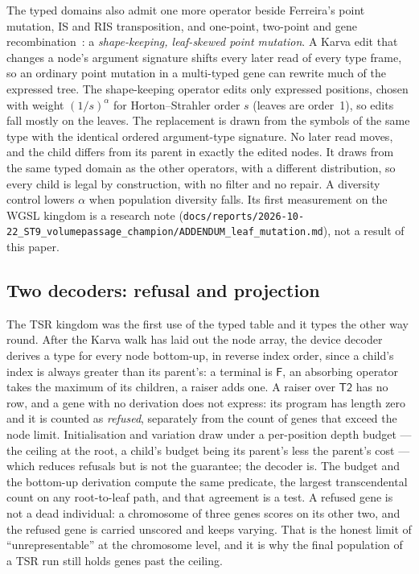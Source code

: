 \documentclass[sigconf,nonacm]{acmart}
\newcommand{\ty}[1]{\textsf{#1}}
\begin{document}
The typed domains also admit one more operator beside Ferreira's point
mutation, IS and RIS transposition, and one-point, two-point and gene
recombination~\cite{ferreira2001gep}: a \emph{shape-keeping, leaf-skewed point
mutation}. A Karva edit that changes a node's argument signature shifts every
later read of every type frame, so an ordinary point mutation in a multi-typed
gene can rewrite much of the expressed tree. The shape-keeping operator edits
only expressed positions, chosen with weight $(1/s)^{\alpha}$ for
Horton--Strahler order $s$ (leaves are order~1), so edits fall mostly on the
leaves. The replacement is drawn from the symbols of the same type with the
identical ordered argument-type signature. No later read moves, and the child
differs from its parent in exactly the edited nodes. It draws from the same
typed domain as the other operators, with a different distribution, so every
child is legal by construction, with no filter and no repair. A diversity
control lowers $\alpha$ when population diversity falls. Its first measurement on
the WGSL kingdom is a research note
(\texttt{docs/reports/2026-10-22\_ST9\_volumepassage\_champion/ADDENDUM\_leaf\_mutation.md}),
not a result of this paper.

\subsection{Two decoders: refusal and projection}

The TSR kingdom was the first use of the typed table and it types the other way
round. After the Karva walk has laid out the node array, the device decoder
derives a type for every node bottom-up, in reverse index order, since a child's
index is always greater than its parent's: a terminal is $\ty{F}$, an absorbing
operator takes the maximum of its children, a raiser adds one. A raiser over
$\ty{T2}$ has no row, and a gene with no derivation does not express: its
program has length zero and it is counted as \emph{refused}, separately from the
count of genes that exceed the node limit. Initialisation and variation draw
under a per-position depth budget --- the ceiling at the root, a child's budget
being its parent's less the parent's cost --- which reduces refusals but is not
the guarantee; the decoder is. The budget and the bottom-up derivation compute
the same predicate, the largest transcendental count on any root-to-leaf path,
and that agreement is a test. A refused gene is not a dead individual: a
chromosome of three genes scores on its other two, and the refused gene is
carried unscored and keeps varying. That is the honest limit of
``unrepresentable'' at the chromosome level, and it is why the final
population of a TSR run still holds genes past the ceiling.
\end{document}
